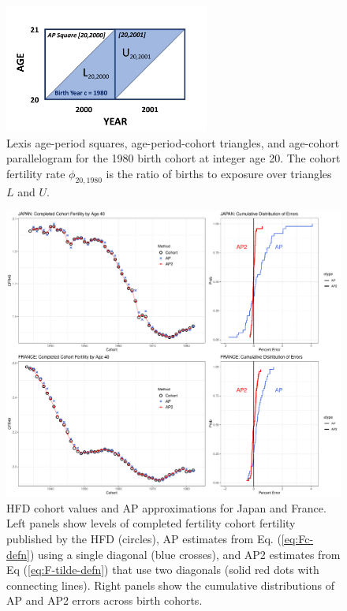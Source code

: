 \documentclass[12pt,letterpaper]{article}
\begin{document}
\clearpage



\clearpage

\begin{figure}
    \centering
    \includegraphics[width=0.6\textwidth]{Plots/2-Lexis-squares-1980-cohort.pdf}
    \caption{Lexis age-period squares, age-period-cohort triangles, and age-cohort parallelogram for the 1980 birth cohort at integer age 20. The cohort fertility rate $\phi_{20,1980}$ is the ratio of  births to exposure over triangles $L$ and $U$.}
    \label{fig:Lexis-2-sq}
\end{figure}

\clearpage

\begin{figure}
    \centering
    \includegraphics[width=1.0\textwidth]{Plots/2x2-summary.pdf}
    \caption{HFD cohort values and AP approximations for Japan and France. Left panels show levels of completed fertility cohort fertility published by the HFD (circles), AP estimates from Eq. (\ref{eq:Fc-defn}) using a single diagonal (blue crosses), and AP2 estimates from Eq (\ref{eq:F-tilde-defn}) that use two diagonals (solid red dots with connecting lines). Right panels show the cumulative distributions of AP and AP2 errors across birth cohorts.}
    \label{fig:JPN vs France}
\end{figure}
\end{document}
